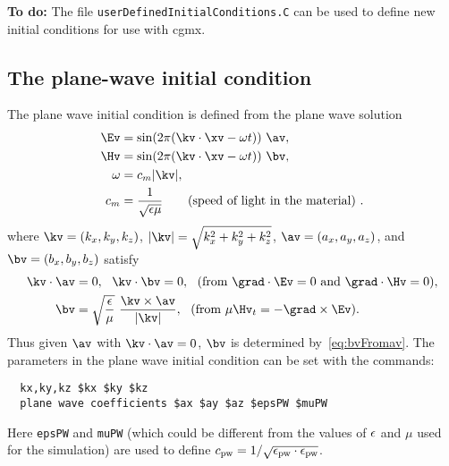 \documentclass{article}
\begin{document}
{\bf To do:} The file {\tt userDefinedInitialConditions.C} can be used to define new initial conditions
for use with cgmx. 

\subsection{The plane-wave initial condition} \label{sec:planeWaveIC}

The plane wave initial condition is defined from the plane wave solution
\begin{align}
  \Ev &= \sin( 2\pi (\kv\cdot\xv - \omega t ))~\av, \label{eq:planeWaveE} \\
  \Hv &= \sin( 2\pi (\kv\cdot\xv - \omega t ))~\bv, \label{eq:planeWaveH} \\
  \omega & = c_m \vert \kv \vert, \\
  c_m &= { 1 \over \sqrt{ \epsilon \mu}}   \qquad \text{(speed of light in the material)} ~.
\end{align}
where $\kv=(k_x,k_y,k_z)$, $\vert \kv \vert = \sqrt{ k_x^2 + k_y^2 + k_z^2 }$,
$\av=(a_x,a_y,a_z)$, and $\bv=(b_x,b_y,b_z)$ satisfy 
\begin{align}
  \kv\cdot\av &=0, ~~\kv\cdot\bv=0, ~~\mbox{(from $\grad\cdot\Ev=0$ and $\grad\cdot\Hv=0$)}, \\
  \bv &= \sqrt{\frac{\epsilon}{\mu}}~{\kv\times\av \over \vert \kv \vert}, 
       ~~\mbox{(from $\mu \Hv_t = -\grad\times\Ev$)} .  \label{eq:bvFromav} 
\end{align}
Thus given $\av$ with $\kv\cdot\av =0$, $\bv$ is determined by~\eqref{eq:bvFromav}.
% 
The parameters in the plane wave initial condition can be set with the commands:
\begin{verbatim}
  kx,ky,kz $kx $ky $kz
  plane wave coefficients $ax $ay $az $epsPW $muPW
\end{verbatim}
Here {\tt epsPW} and {\tt muPW} (which could be different from the values of $\epsilon$ and $\mu$ used
for the simulation) are used to define $c_{\rm pw}=1/\sqrt{ \epsilon_{\rm pw}\cdot \epsilon_{\rm pw}}$.
\end{document}

